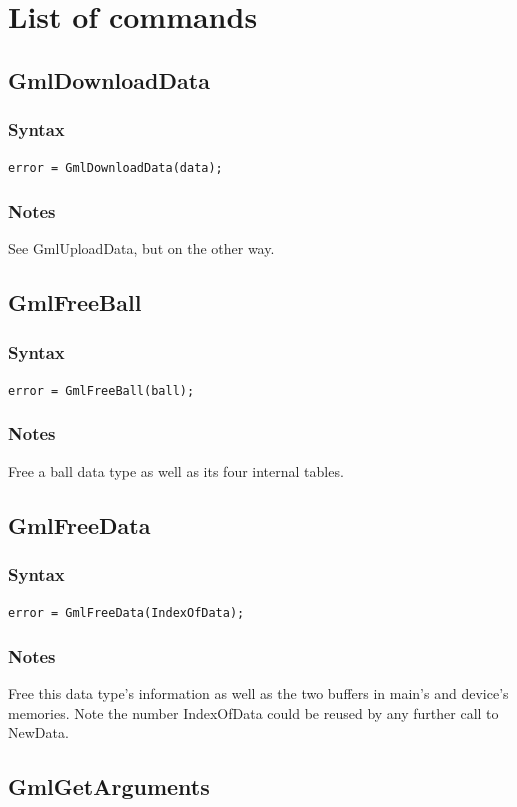 \documentclass[a4paper,12pt]{article}
\begin{document}
%
%

\section{List of commands}


\subsection{GmlDownloadData}
\subsubsection*{Syntax}
{\tt error = GmlDownloadData(data);}
\subsubsection*{Notes}
See GmlUploadData, but on the other way.


\subsection{GmlFreeBall}
\subsubsection*{Syntax}
{\tt error = GmlFreeBall(ball);}
\subsubsection*{Notes}
Free a ball data type as well as its four internal tables.


\subsection{GmlFreeData}
\subsubsection*{Syntax}
{\tt error = GmlFreeData(IndexOfData);}
\subsubsection*{Notes}
Free this data type's information as well as the two buffers in main's and device's memories. Note the number IndexOfData could be reused by any further call to NewData.


\subsection{GmlGetArguments}
\end{document}
